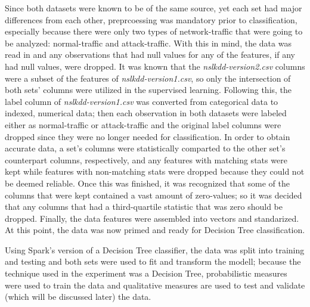 \documentclass[a4paper,12pt]{IEEEtran}
\begin{document}
Since both datasets were known to be of the same source, yet each set had major differences from each other, preprcoessing was mandatory prior to classification, especially because there were only two types of network-traffic that were going to be analyzed: normal-traffic and attack-traffic. With this in mind, the data was read in and any observations that had null values for any of the features, if any had null values, were dropped. It was known that the \textit{nslkdd-version2.csv} columns were a subset of the features of \textit{nslkdd-version1.csv}, so only the intersection of both sets' columns were utilized in the supervised learning. Following this, the label column of \textit{nslkdd-version1.csv} was converted from categorical data to indexed, numerical data; then each observation in both datasets were labeled either as normal-traffic or attack-traffic and the original label columns were dropped since they were no longer needed for classification. In order to obtain accurate data, a set's columns were statistically comparted to the other set's counterpart columns, respectively, and any features with matching stats were kept while features with non-matching stats were dropped because they could not be deemed reliable. Once this was finished, it was recognized that some of the columns that were kept contained a vast amount of zero-values; so it was decided that any columns that had a third-quartile statistic that was zero should be dropped. Finally, the data features were assembled into vectors and standarized. At this point, the data was now primed and ready for Decision Tree classification.

Using Spark's version of a Decision Tree classifier, the data was split into training and testing and both sets were used to fit and transform the modell; because the technique used in the experiment was a Decision Tree, probabilistic measures were used to train the data and qualitative measures are used to test and validate (which will be discussed later) the data. 
\end{document}
